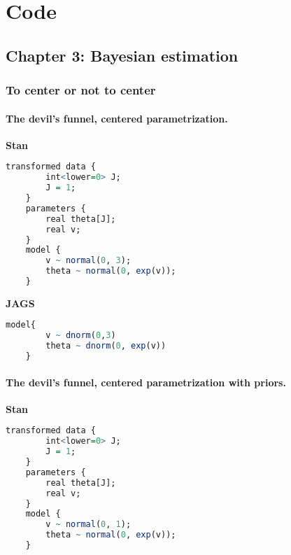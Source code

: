 \chapter{Code} \label{appC:additional}


\section{Chapter 3: Bayesian estimation} \label{appC1:chapter3}

\subsection{To center or not to center} \label{appC1_1:noncenter}

\subsubsection{The devil's funnel, centered parametrization.} 

\textbf{Stan} \\
%
\begin{lstlisting}[language=R]
	transformed data {
		int<lower=0> J;
		J = 1;
	}
	parameters {
		real theta[J];
		real v;
	}
	model {
		v ~ normal(0, 3);
		theta ~ normal(0, exp(v));
	}
\end{lstlisting}


\noindent \textbf{JAGS} \\
%
\begin{lstlisting}[language=R]
	model{
		v ~ dnorm(0,3)
		theta ~ dnorm(0, exp(v))
	}
\end{lstlisting}




\subsubsection{The devil's funnel, centered parametrization with priors.} 

\textbf{Stan} \\
%
\begin{lstlisting}[language=R]
	transformed data {
		int<lower=0> J;
		J = 1;
	}
	parameters {
		real theta[J];
		real v;
	}
	model {
		v ~ normal(0, 1);
		theta ~ normal(0, exp(v));
	}
\end{lstlisting}


